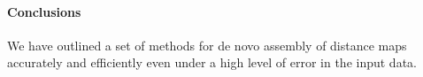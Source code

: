 \documentclass[11pt]{article}
\begin{document}
\paragraph{Conclusions\newline}

\par{
We have outlined a set of methods for de novo assembly of distance maps accurately and efficiently even under a high level of error in the input data.
}





\end{document}
